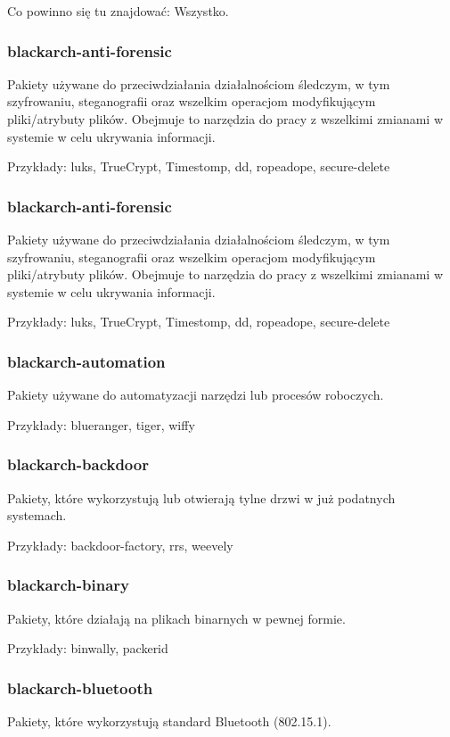 \documentclass[a4paper, oneside, 11pt]{book}
\begin{document}
Co powinno się tu znajdować: Wszystko.

\subsubsection{blackarch-anti-forensic}
Pakiety używane do przeciwdziałania działalnościom śledczym, w tym szyfrowaniu, steganografii oraz wszelkim operacjom modyfikującym pliki/atrybuty plików.
Obejmuje to narzędzia do pracy z wszelkimi zmianami w systemie w celu ukrywania informacji.

Przykłady: luks, TrueCrypt, Timestomp, dd, ropeadope, secure-delete

\subsubsection{blackarch-anti-forensic}
Pakiety używane do przeciwdziałania działalnościom śledczym, w tym szyfrowaniu, steganografii oraz wszelkim operacjom modyfikującym pliki/atrybuty plików. Obejmuje to narzędzia do pracy z wszelkimi zmianami w systemie w celu ukrywania informacji.

Przykłady: luks, TrueCrypt, Timestomp, dd, ropeadope, secure-delete

\subsubsection{blackarch-automation}
Pakiety używane do automatyzacji narzędzi lub procesów roboczych.

Przykłady: blueranger, tiger, wiffy

\subsubsection{blackarch-backdoor}
Pakiety, które wykorzystują lub otwierają tylne drzwi w już podatnych systemach.

Przykłady: backdoor-factory, rrs, weevely

\subsubsection{blackarch-binary}
Pakiety, które działają na plikach binarnych w pewnej formie.

Przykłady: binwally, packerid

\subsubsection{blackarch-bluetooth}
Pakiety, które wykorzystują standard Bluetooth (802.15.1).
\end{document}
